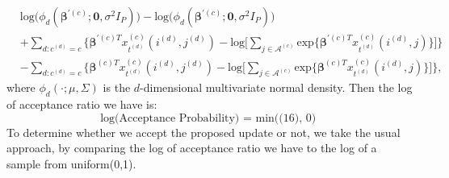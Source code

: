 \documentclass[a4paper]{article}
\begin{document}
\begin{equation}
\begin{aligned} 
&\mbox{log}\Big(\phi_d(\boldsymbol{\beta}^{\prime(c)};\mathbf{0}, \sigma^2I_P)\Big)-\mbox{log}\Big(\phi_d(\boldsymbol{\beta}^{\prime(c)};\mathbf{0}, \sigma^2I_P)\Big)\\&+\sum_{d:c^{(d)}=c}\Big\{\boldsymbol{\beta}^{\prime(c)T}x^{(c)}_{t^{(d)}}(i^{(d)}, j^{(d)})-\mbox{log}\big[\sum_{j\in \mathcal{A}^{(c)}}\mbox{exp}\{\boldsymbol{\beta}^{\prime(c)T}x^{(c)}_{t^{(d)}}(i^{(d)}, j)\}\big]\Big\}\\&-\sum_{d:c^{(d)}=c} \Big\{\boldsymbol{\beta}^{(c)T}x^{(c)}_{t^{(d)}}(i^{(d)}, j^{(d)})-\mbox{log}\big[\sum_{j\in \mathcal{A}^{(c)}}\mbox{exp}\{\boldsymbol{\beta}^{(c)T}x^{(c)}_{t^{(d)}}(i^{(d)}, j)\}\big]\Big\},
\end{aligned}
\end{equation}
where $\phi_d(\cdot;\mu, \Sigma)$ is the $d$-dimensional multivariate normal density.
Then the log of acceptance ratio we have is:
\begin{equation}
\mbox{log(Acceptance Probability) = min((16), 0) }
\end{equation}
To determine whether we accept the proposed update or not, we take the usual approach, by comparing the log of acceptance ratio we have to the log of a sample from uniform(0,1).\\
\end{document}
